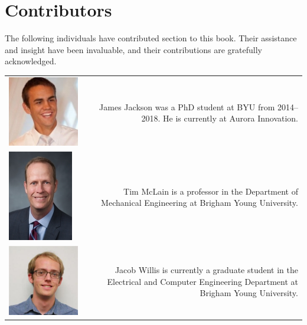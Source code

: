 \chapter*{Contributors}

The following individuals have contributed section to this book.  Their assistance and insight have been invaluable, and their contributions are gratefully acknowledged.


\begin{tabular}{l|r}
\includegraphics[width=.25\linewidth]{contributors/james_jackson} & 
\begin{minipage}{0.75\linewidth}
	James Jackson was a PhD student at BYU from 2014--2018.  He is currently at Aurora Innovation.
\end{minipage} \\
%
\includegraphics[width=.25\linewidth]{contributors/tim_mclain} & 
\begin{minipage}{0.75\linewidth}
		Tim McLain is a professor in the Department of Mechanical Engineering at Brigham Young University.
\end{minipage} \\
%
\includegraphics[width=.25\linewidth]{contributors/jacob_willis} & 
\begin{minipage}{0.75\linewidth}
	Jacob Willis is currently a graduate student in the Electrical and Computer Engineering Department at Brigham Young University.

\end{minipage}
\end{tabular}
